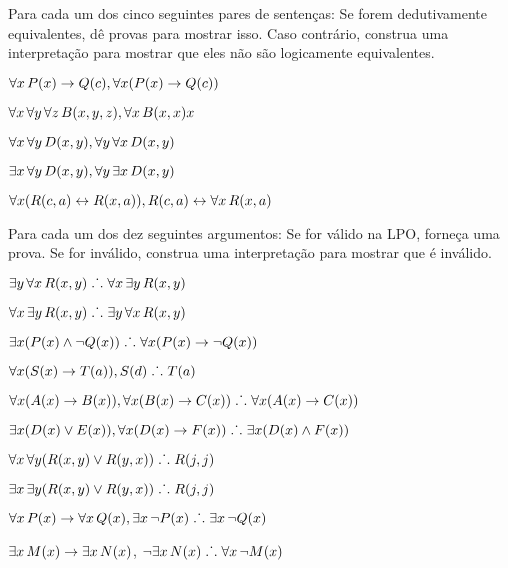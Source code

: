 \solutions
\problempart
\label{pr.FOLequivornot}
Para cada um dos cinco seguintes pares de senten\c cas: Se forem dedutivamente equivalentes, d\^e provas para mostrar isso. Caso contr\'ario, construa uma interpreta\c c\~ao para mostrar que eles n\~ao s\~ao logicamente equivalentes.
\begin{earg}
\item $\forall x\,\mathord{P}(x) \rightarrow \mathord{Q}(c), \forall x (\mathord{P}(x) \rightarrow \mathord{Q}(c))$
\item $\forall x\,\forall y\, \forall z\,\mathord{B}(x,y,z), \forall x\,\mathord{B}(x,x)x$
\item $\forall x\,\forall y\,\mathord{D}(x,y), \forall y\,\forall x\,\mathord{D}(x,y)$
\item $\exists x\,\forall y\,\mathord{D}(x,y), \forall y\,\exists x\,\mathord{D}(x,y)$
\item $\forall x (\mathord{R}(c,a) \leftrightarrow \mathord{R}(x,a)), \mathord{R}(c,a) \leftrightarrow \forall x\,\mathord{R}(x,a)$
\end{earg}

\solutions
\problempart
\label{pr.FOLvalidornot}
Para cada um dos dez seguintes argumentos: Se for v\'alido na LPO, forne\c ca uma prova. Se for inv\'alido, construa uma interpreta\c c\~ao para mostrar que \'e inv\'alido.
\begin{earg}
\item $\exists y\,\forall x\,\mathord{R}(x,y) \mathrel{\ldotp\dot{}\,\ldotp} \forall x\,\exists y\,\mathord{R}(x,y)$
\item $\forall x\,\exists y\,\mathord{R}(x,y) \mathrel{\ldotp\dot{}\,\ldotp}  \exists y\,\forall x\,\mathord{R}(x,y)$
\item $\exists x(\mathord{P}(x) \wedge \neg \mathord{Q}(x)) \mathrel{\ldotp\dot{}\,\ldotp} \forall x(\mathord{P}(x) \rightarrow \neg \mathord{Q}(x))$
\item $\forall x(\mathord{S}(x) \rightarrow \mathord{T}(a)), \mathord{S}(d) \mathrel{\ldotp\dot{}\,\ldotp} \mathord{T}(a)$
\item $\forall x(\mathord{A}(x)\rightarrow \mathord{B}(x)), \forall x(\mathord{B}(x) \rightarrow \mathord{C}(x)) \mathrel{\ldotp\dot{}\,\ldotp} \forall x(\mathord{A}(x) \rightarrow \mathord{C}(x))$
\item $\exists x(\mathord{D}(x) \vee \mathord{E}(x)), \forall x(\mathord{D}(x) \rightarrow \mathord{F}(x)) \mathrel{\ldotp\dot{}\,\ldotp} \exists x(\mathord{D}(x) \wedge \mathord{F}(x))$
\item $\forall x\,\forall y(\mathord{R}(x,y) \vee \mathord{R}(y,x)) \mathrel{\ldotp\dot{}\,\ldotp} \mathord{R}(j,j)$
\item $\exists x\,\exists y(\mathord{R}(x,y) \vee \mathord{R}(y,x)) \mathrel{\ldotp\dot{}\,\ldotp} \mathord{R}(j,j)$
\item $\forall x\,\mathord{P}(x) \rightarrow \forall x\,\mathord{Q}(x), \exists x\, \neg\mathord{P}(x) \mathrel{\ldotp\dot{}\,\ldotp} \exists x\, \neg \mathord{Q}(x)$
\item $\exists x\,\mathord{M}(x) \rightarrow \exists x\,\mathord{N}(x)$, $\neg \exists x\,\mathord{N}(x)\mathrel{\ldotp\dot{}\,\ldotp}  \forall x\, \neg \mathord{M}(x)$
\end{earg}

